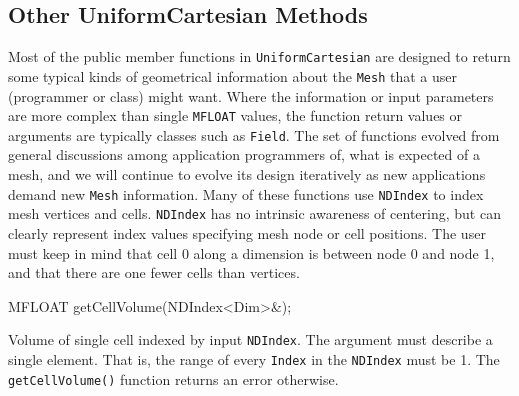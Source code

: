 \subsection{Other UniformCartesian Methods} 
Most of the public member functions in \texttt{UniformCartesian} are designed to return some typical kinds of geometrical information about the \texttt{Mesh} that a user (programmer or class) might want. 
Where the information or input parameters are more complex than single \texttt{MFLOAT} values, the function return values or arguments are typically \ippl classes  such as \texttt{Field}.
The set of functions evolved from general discussions among application programmers of, what is expected of a mesh, and we will continue to evolve its design iteratively as new applications demand new \texttt{Mesh} 
information. Many of these functions use \texttt{NDIndex} to index mesh vertices and cells. \texttt{NDIndex} has no intrinsic awareness of centering, but can clearly represent index values specifying 
mesh node or cell positions. The user must keep in mind that cell 0 along a dimension is between node 0 and node 1, and that there are one fewer cells than vertices. 
\begin{smallcode}
MFLOAT getCellVolume(NDIndex<Dim>&);
\end{smallcode} 
Volume of single cell indexed by input \texttt{NDIndex}. The argument must describe a single element. That is, the range of every \texttt{Index} in the \texttt{NDIndex} must be 1. The \texttt{getCellVolume()} function 
returns an error otherwise.

